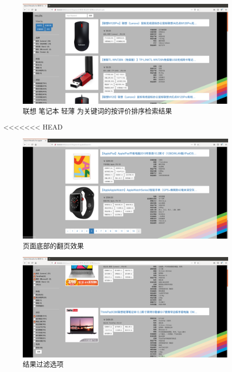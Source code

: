 \begin{figure}[htbp]
\centering
\includegraphics[width=13.5cm]{img/zlt/high_rank.png}
\caption{联想 笔记本 轻薄 为关键词的按评价排序检索结果}
\label{fig:zlt_high_rank}
\end{figure}

<<<<<<< HEAD
\begin{figure}[htbp]
\centering
\includegraphics[width=13.5cm]{img/zlt/leafflip.png}
\caption{页面底部的翻页效果}
\label{fig:zlt_leaf_flip}
\end{figure}

\begin{figure}[htbp]
\centering
\includegraphics[width=13.5cm]{img/zlt/filter1.png}
\caption{结果过滤选项}
\label{fig:zlt_filter1}
\end{figure}

